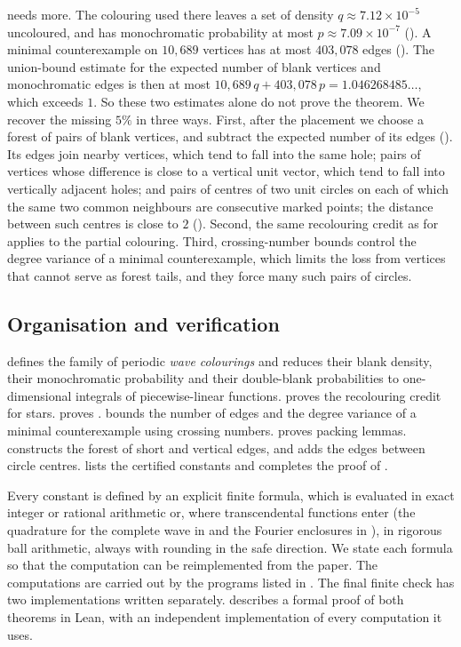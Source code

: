 \documentclass[11pt,colorlinks]{charlie}
\begin{document}
 needs more. The colouring used there leaves a set of density $q\approx7.12\times10^{-5}$ uncoloured, and has monochromatic probability at most $p\approx7.09\times10^{-7}$ (). A minimal counterexample on $10{,}689$ vertices has at most $403{,}078$ edges (). The union-bound estimate for the expected number of blank vertices and monochromatic edges is then at most $10{,}689\,q+403{,}078\,p=1.046268485\ldots$, which exceeds $1$. So these two estimates alone do not prove the theorem. We recover the missing $5\%$ in three ways. First, after the placement we choose a forest of pairs of blank vertices, and subtract the expected number of its edges (). Its edges join nearby vertices, which tend to fall into the same hole; pairs of vertices whose difference is close to a vertical unit vector, which tend to fall into vertically adjacent holes; and pairs of centres of two unit circles on each of which the same two common neighbours are consecutive marked points; the distance between such centres is close to $2$ (). Second, the same recolouring credit as for  applies to the partial colouring. Third, crossing-number bounds control the degree variance of a minimal counterexample, which limits the loss from vertices that cannot serve as forest tails, and they force many such pairs of circles.

\subsection*{Organisation and verification}
 defines the family of periodic \emph{wave colourings} and reduces their blank density, their monochromatic probability and their double-blank probabilities to one-dimensional integrals of piecewise-linear functions.  proves the recolouring credit for stars.  proves .  bounds the number of edges and the degree variance of a minimal counterexample using crossing numbers.  proves packing lemmas.  constructs the forest of short and vertical edges, and  adds the edges between circle centres.  lists the certified constants and completes the proof of .

Every constant is defined by an explicit finite formula, which is evaluated in exact integer or rational arithmetic or, where transcendental functions enter (the quadrature for the complete wave in  and the Fourier enclosures in ), in rigorous ball arithmetic, always with rounding in the safe direction. We state each formula so that the computation can be reimplemented from the paper. The computations are carried out by the programs listed in . The final finite check has two implementations written separately.  describes a formal proof of both theorems in Lean, with an independent implementation of every computation it uses.
\end{document}
